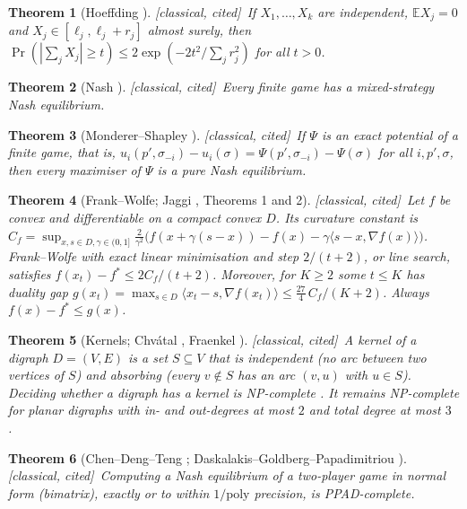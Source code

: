 \documentclass[11pt]{article}
\newtheorem{theorem}{Theorem}[section]
\theoremstyle{definition}
\theoremstyle{remark}
\newcommand{\E}{\mathbb{E}}
\newcommand{\CLASSICAL}{\textsf{[classical, cited]}}
\begin{document}
\begin{theorem}[Hoeffding \cite{Hoeffding63}]\label{thm:hoeffding} \CLASSICAL\
If $X_1,\dots,X_k$ are independent, $\E X_j=0$ and $X_j\in[\ell_j,\ell_j+r_j]$ almost surely, then $\Pr(|\sum_jX_j|\ge t)\le2\exp(-2t^2/\sum_jr_j^2)$ for all $t>0$.
\end{theorem}

\begin{theorem}[Nash \cite{Nash51}]\label{thm:nash} \CLASSICAL\
Every finite game has a mixed-strategy Nash equilibrium.
\end{theorem}

\begin{theorem}[Monderer--Shapley \cite{MS96}]\label{thm:ms} \CLASSICAL\
If $\Psi$ is an exact potential of a finite game, that is, $u_i(p',\sigma_{-i})-u_i(\sigma)=\Psi(p',\sigma_{-i})-\Psi(\sigma)$ for all $i,p',\sigma$, then every maximiser of $\Psi$ is a pure Nash equilibrium.
\end{theorem}

\begin{theorem}[Frank--Wolfe; Jaggi \cite{Jaggi13}, Theorems 1 and 2]\label{thm:jaggi} \CLASSICAL\
Let $f$ be convex and differentiable on a compact convex $D$. Its curvature constant is
$C_f=\sup_{x,s\in D,\gamma\in(0,1]}\frac{2}{\gamma^2}\big(f(x+\gamma(s-x))-f(x)-\gamma\langle s-x,\nabla f(x)\rangle\big)$.
Frank--Wolfe with exact linear minimisation and step $2/(t+2)$, or line search, satisfies $f(x_t)-f^*\le 2C_f/(t+2)$. Moreover, for $K\ge2$ some $t\le K$ has duality gap $g(x_t)=\max_{s\in D}\langle x_t-s,\nabla f(x_t)\rangle\le\frac{27}{4}\,C_f/(K+2)$. Always $f(x)-f^*\le g(x)$.
\end{theorem}

\begin{theorem}[Kernels; Chvátal \cite{Chvatal73}, Fraenkel \cite{Fraenkel81}]\label{thm:kernel} \CLASSICAL\
A \emph{kernel} of a digraph $D=(V,E)$ is a set $S\subseteq V$ that is independent (no arc between two vertices of $S$) and absorbing (every $v\notin S$ has an arc $(v,u)$ with $u\in S$). Deciding whether a digraph has a kernel is NP-complete \cite{Chvatal73}. It remains NP-complete for planar digraphs with in- and out-degrees at most $2$ and total degree at most $3$ \cite{Fraenkel81}.
\end{theorem}

\begin{theorem}[Chen--Deng--Teng \cite{CDT09}; Daskalakis--Goldberg--Papadimitriou \cite{DGP09}]\label{thm:ppad} \CLASSICAL\
Computing a Nash equilibrium of a two-player game in normal form (bimatrix), exactly or to within $1/\mathrm{poly}$ precision, is PPAD-complete.
\end{theorem}
\end{document}
